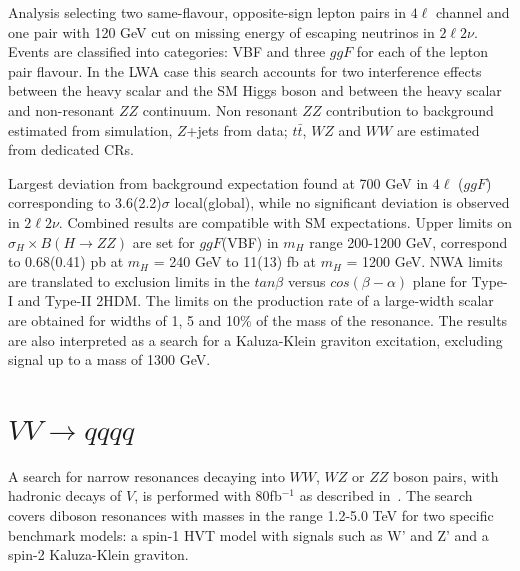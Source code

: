 \documentclass{PoS}
\begin{document}
Analysis selecting two same-flavour, opposite-sign lepton pairs in $4\ell$ channel and one pair with 120 GeV cut on missing energy of escaping neutrinos in $2\ell2\nu$.
Events are classified into categories: VBF and three $ggF$ for each of the lepton pair flavour.
In the LWA case this search accounts for two interference effects between the heavy scalar and the SM Higgs boson and between the heavy scalar and non-resonant $ZZ$ continuum.
Non resonant $ZZ$ contribution to background estimated from simulation, $Z$+jets from data; $t\bar{t}$, $WZ$ and $WW$ are estimated from dedicated CRs.

Largest deviation from background expectation found at 700 GeV in $4\ell$ ($ggF$) corresponding to 3.6(2.2)$\sigma$ local(global), while no significant deviation is observed in $2\ell2\nu$. Combined results are compatible with SM expectations. 
Upper limits on $\sigma_H \times B(H\rightarrow ZZ)$ are set for $ggF$(VBF) in $m_H$ range 200-1200 GeV, correspond to 0.68(0.41) pb at $m_H$ = 240 GeV to 11(13) fb at $m_H$ = 1200 GeV. NWA limits are translated to exclusion limits in the $tan \beta$ versus $cos(\beta-\alpha)$ plane for Type-I and Type-II 2HDM. The limits on the production rate of a large-width scalar are obtained for widths of 1, 5 and 10\% of the mass of the resonance.
The results are also interpreted as a search for a Kaluza-Klein graviton excitation, excluding signal up to a mass of 1300 GeV. 


\section{$VV\rightarrow qqqq$}
\label{sec:VV}
A search for narrow resonances decaying into $WW$, $WZ$ or $ZZ$ boson pairs, with hadronic decays of $V$, is performed with 80fb$^{-1}$ as described in~\cite{ATLAS-CONF-2018-016}. The search covers diboson resonances with masses in the range 1.2-5.0 TeV for two specific benchmark models: a spin-1 HVT model with signals such as W' and Z' and a spin-2 Kaluza-Klein graviton.
\end{document}
